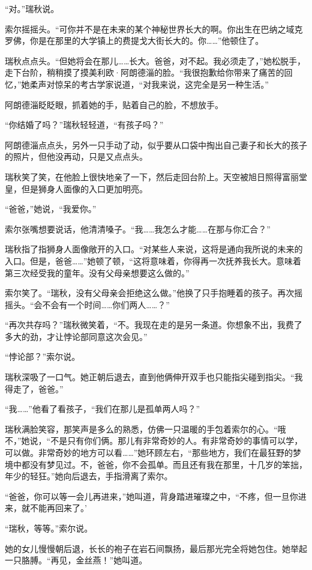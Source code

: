 \documentclass[AutoFakeBold=true]{book}
\begin{document}
``对。''瑞秋说。

索尔摇摇头。``可你并不是在未来的某个神秘世界长大的啊。你出生在巴纳之域克罗佛，你是在那里的大学镇上的费提戈大街长大的。你……''他顿住了。

瑞秋点点头。``但她将会在那儿……长大。爸爸，对不起。我必须走了，''她松脱手，走下台阶，稍稍摸了摸美利欧·阿朗德淄的脸。``我很抱歉给你带来了痛苦的回忆，''她柔声对惊呆的考古学家说道，``对我来说，这完全是另一种生活。''

阿朗德淄眨眨眼，抓着她的手，贴着自己的脸，不想放手。

``你结婚了吗？''瑞秋轻轻道，``有孩子吗？''

阿朗德淄点点头，另外一只手动了动，似乎要从口袋中掏出自己妻子和长大的孩子的照片，但他没再动，只是又点点头。

瑞秋笑了笑，在他脸上很快地亲了一下，然后走回台阶上。天空被旭日照得富丽堂皇，但是狮身人面像的入口更加明亮。

``爸爸，''她说，``我爱你。''

索尔张嘴想要说话，他清清嗓子。``我……我怎么才能……在那与你汇合？''

瑞秋指了指狮身人面像敞开的入口。``对某些人来说，这将是通向我所说的未来的入口。但是，爸爸……''她顿了顿，``这将意味着，你得再一次抚养我长大。意味着第三次经受我的童年。没有父母亲想要这么做的。''

索尔笑了。``瑞秋，没有父母亲会拒绝这么做。''他换了只手抱睡着的孩子。再次摇摇头。``会不会有一个时间……你们两人……？''

``再次共存吗？''瑞秋微笑着，``不。我现在走的是另一条道。你想象不出，我费了多大的劲，才让悖论部同意这次会见。''

``悖论部？''索尔说。

瑞秋深吸了一口气。她正朝后退去，直到他俩伸开双手也只能指尖碰到指尖。``我得走了，爸爸。''

``我……''他看了看孩子，``我们在那儿是孤单两人吗？''

瑞秋满脸笑容，那笑声是多么的熟悉，仿佛一只温暖的手包着索尔的心。``哦不，''她说，``不是只有你们俩。那儿有非常奇妙的人。有非常奇妙的事情可以学，可以做。非常奇妙的地方可以看……''她环顾左右，``那些地方，我们在最狂野的梦境中都没有梦见过。不，爸爸，你不会孤单。而且还有我在那里，十几岁的笨拙，年少的轻狂。''她向后退去，手指滑离了索尔。

``爸爸，你可以等一会儿再进来，''她叫道，背身踏进璀璨之中，``不疼，但一旦你进来，就不能再回来了。'

``瑞秋，等等。''索尔说。

她的女儿慢慢朝后退，长长的袍子在岩石间飘扬，最后那光完全将她包住。她举起一只胳膊。``再见，金丝燕！''她叫道。
\end{document}
